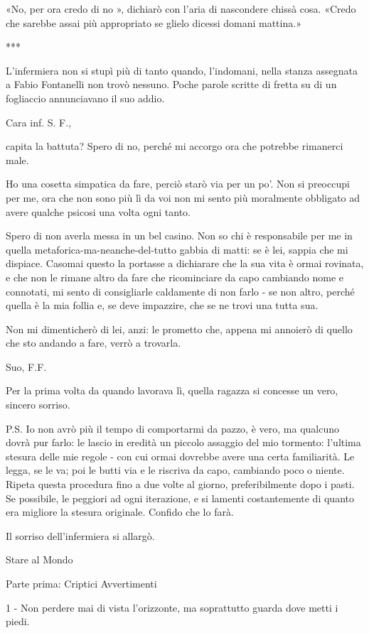 «No, per ora credo di no », dichiarò con l'aria di nascondere chissà cosa. «Credo che sarebbe assai più appropriato se glielo dicessi domani mattina.»

***

L'infermiera non si stupì più di tanto quando, l'indomani, nella stanza assegnata a Fabio Fontanelli non trovò nessuno. Poche parole scritte di fretta su di un fogliaccio annunciavano il suo addio.

Cara inf. S. F.,

capita la battuta? Spero di no, perché mi accorgo ora che potrebbe rimanerci male.

Ho una cosetta simpatica da fare, perciò starò via per un po'. Non si preoccupi per me, ora che non sono più lì da voi non mi sento più moralmente obbligato ad avere qualche psicosi una volta ogni tanto.

Spero di non averla messa in un bel casino. Non so chi è responsabile per me in quella metaforica-ma-neanche-del-tutto gabbia di matti: se è lei, sappia che mi dispiace. Casomai questo la portasse a dichiarare che la sua vita è ormai rovinata, e che non le rimane altro da fare che ricominciare da capo cambiando nome e connotati, mi sento di consigliarle caldamente di non farlo - se non altro, perché quella è la mia follia e, se deve impazzire, che se ne trovi una tutta sua.

Non mi dimenticherò di lei, anzi: le prometto che, appena mi annoierò di quello che sto andando a fare, verrò a trovarla.

Suo,
F.F.

Per la prima volta da quando lavorava lì, quella ragazza si concesse un vero, sincero sorriso.

P.S. Io non avrò più il tempo di comportarmi da pazzo, è vero, ma qualcuno dovrà pur farlo: le lascio in eredità un piccolo assaggio del mio tormento: l'ultima stesura delle mie regole - con cui ormai dovrebbe avere una certa familiarità. Le legga, se le va; poi le butti via e le riscriva da capo, cambiando poco o niente. Ripeta questa procedura fino a due volte al giorno, preferibilmente dopo i pasti. Se possibile, le peggiori ad ogni iterazione, e si lamenti costantemente di quanto era migliore la stesura originale. Confido che lo farà.

Il sorriso dell'infermiera si allargò.

Stare al Mondo

Parte prima: Criptici Avvertimenti

1 - Non perdere mai di vista l’orizzonte, ma soprattutto guarda dove metti i piedi.

